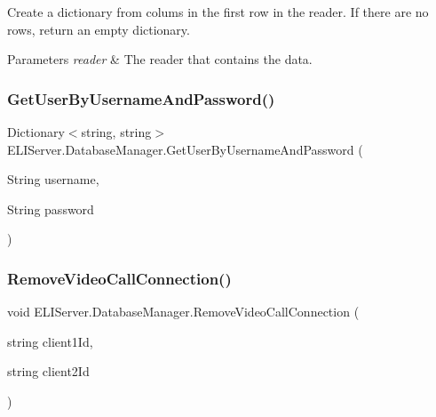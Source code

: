 Create a dictionary from colums in the first row in the reader. If there are no rows, return an empty dictionary. 


\begin{DoxyParams}{Parameters}
{\em reader} & The reader that contains the data.\\
\hline
\end{DoxyParams}
\mbox{\label{class_e_l_i_server_1_1_database_manager_a5eaf0569ca067ab6e074fc76c03439fe}} 
\subsubsection{\texorpdfstring{Get\+User\+By\+Username\+And\+Password()}{GetUserByUsernameAndPassword()}}
{\footnotesize\ttfamily Dictionary$<$string, string$>$ E\+L\+I\+Server.\+Database\+Manager.\+Get\+User\+By\+Username\+And\+Password (\begin{DoxyParamCaption}\item[{String}]{username,  }\item[{String}]{password }\end{DoxyParamCaption})\hspace{0.3cm}{\ttfamily [inline]}}

\mbox{\label{class_e_l_i_server_1_1_database_manager_a8e8315c9b23095cbe799c8f75ccacc87}} 
\subsubsection{\texorpdfstring{Remove\+Video\+Call\+Connection()}{RemoveVideoCallConnection()}}
{\footnotesize\ttfamily void E\+L\+I\+Server.\+Database\+Manager.\+Remove\+Video\+Call\+Connection (\begin{DoxyParamCaption}\item[{string}]{client1\+Id,  }\item[{string}]{client2\+Id }\end{DoxyParamCaption})\hspace{0.3cm}{\ttfamily [inline]}}


